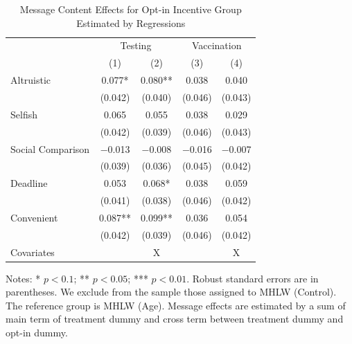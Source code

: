 \documentclass[
]{article}
\begin{document}
\begin{table}

\caption{\label{tab:lh-int-woA}Message Content Effects for Opt-in Incentive Group Estimated by Regressions}
\centering
\fontsize{9}{11}\selectfont
\begin{threeparttable}
\begin{tabular}[t]{lcccc}
\toprule
\multicolumn{1}{c}{ } & \multicolumn{2}{c}{Testing} & \multicolumn{2}{c}{Vaccination} \\
\cmidrule(l{3pt}r{3pt}){2-3} \cmidrule(l{3pt}r{3pt}){4-5}
  & (1) & (2) & (3) & (4)\\
\midrule
Altruistic & \num{0.077}* & \num{0.080}** & \num{0.038} & \num{0.040}\\
 & (\num{0.042}) & (\num{0.040}) & (\num{0.046}) & (\num{0.043})\\
Selfish & \num{0.065} & \num{0.055} & \num{0.038} & \num{0.029}\\
 & (\num{0.042}) & (\num{0.039}) & (\num{0.046}) & (\num{0.043})\\
Social Comparison & \num{-0.013} & \num{-0.008} & \num{-0.016} & \num{-0.007}\\
 & (\num{0.039}) & (\num{0.036}) & (\num{0.045}) & (\num{0.042})\\
Deadline & \num{0.053} & \num{0.068}* & \num{0.038} & \num{0.059}\\
 & (\num{0.041}) & (\num{0.038}) & (\num{0.046}) & (\num{0.042})\\
Convenient & \num{0.087}** & \num{0.099}** & \num{0.036} & \num{0.054}\\
 & (\num{0.042}) & (\num{0.039}) & (\num{0.046}) & (\num{0.042})\\
Covariates &  & X &  & X\\
\bottomrule
\end{tabular}
\begin{tablenotes}
\item Notes: * $p < 0.1$; ** $p < 0.05$; *** $p < 0.01$. Robust standard errors are in parentheses. We exclude from the sample those assigned to MHLW (Control). The reference group is MHLW (Age). Message effects are estimated by a sum of main term of treatment dummy and cross term between treatment dummy and opt-in dummy.
\end{tablenotes}
\end{threeparttable}
\end{table}
\end{document}
